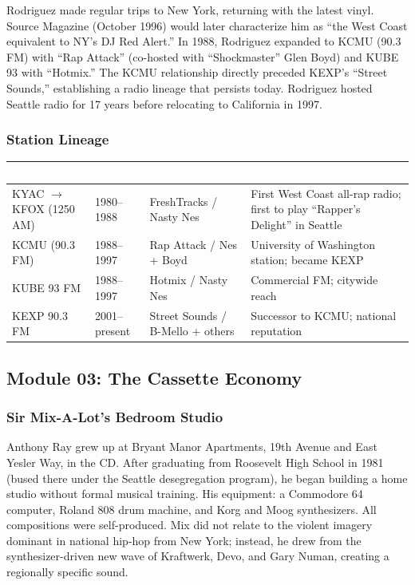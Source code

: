 \documentclass[11pt,letterpaper]{article}
\newcommand{\tableheader}[1]{\textbf{\sffamily\textcolor{white}{#1}}}
\begin{document}
Rodriguez made regular trips to New York, returning with the latest vinyl. Source Magazine (October 1996) would later characterize him as ``the West Coast equivalent to NY's DJ Red Alert.'' In 1988, Rodriguez expanded to KCMU (90.3 FM) with ``Rap Attack'' (co-hosted with ``Shockmaster'' Glen Boyd) and KUBE 93 with ``Hotmix.'' The KCMU relationship directly preceded KEXP's ``Street Sounds,'' establishing a radio lineage that persists today. Rodriguez hosted Seattle radio for 17 years before relocating to California in 1997.

\subsubsection{Station Lineage}

\begin{center}
\begin{tabularx}{\textwidth}{L{2.5cm}L{2cm}L{3cm}X}
\toprule
{}
\tableheader{Station} & \tableheader{Years} & \tableheader{Show / DJ} & \tableheader{Significance} \\
\midrule
KYAC $\rightarrow$ KFOX (1250 AM) & 1980--1988 & FreshTracks / Nasty Nes & First West Coast all-rap radio; first to play ``Rapper's Delight'' in Seattle \\
KCMU (90.3 FM) & 1988--1997 & Rap Attack / Nes + Boyd & University of Washington station; became KEXP \\
KUBE 93 FM & 1988--1997 & Hotmix / Nasty Nes & Commercial FM; citywide reach \\
KEXP 90.3 FM & 2001--present & Street Sounds / B-Mello + others & Successor to KCMU; national reputation \\
\bottomrule
\end{tabularx}
\end{center}

\subsection{Module 03: The Cassette Economy}

\subsubsection{Sir Mix-A-Lot's Bedroom Studio}

Anthony Ray grew up at Bryant Manor Apartments, 19th Avenue and East Yesler Way, in the CD. After graduating from Roosevelt High School in 1981 (bused there under the Seattle desegregation program), he began building a home studio without formal musical training. His equipment: a Commodore 64 computer, Roland 808 drum machine, and Korg and Moog synthesizers. All compositions were self-produced. Mix did not relate to the violent imagery dominant in national hip-hop from New York; instead, he drew from the synthesizer-driven new wave of Kraftwerk, Devo, and Gary Numan, creating a regionally specific sound.
\end{document}
